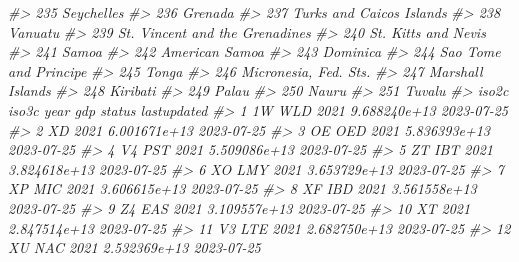 \documentclass[
  xelatex, ja=standard]{bxjsbook}
\newenvironment{Shaded}{\begin{snugshade}}{\end{snugshade}}
\newcommand{\CommentTok}[1]{\textcolor[rgb]{0.56,0.35,0.01}{\textit{#1}}}
\theoremstyle{definition}
\theoremstyle{definition}
\theoremstyle{definition}
\theoremstyle{definition}
\theoremstyle{remark}
\begin{document}
\begin{Shaded}
\begin{Highlighting}[]
\CommentTok{\#\textgreater{} 235                                           Seychelles}
\CommentTok{\#\textgreater{} 236                                              Grenada}
\CommentTok{\#\textgreater{} 237                             Turks and Caicos Islands}
\CommentTok{\#\textgreater{} 238                                              Vanuatu}
\CommentTok{\#\textgreater{} 239                       St. Vincent and the Grenadines}
\CommentTok{\#\textgreater{} 240                                  St. Kitts and Nevis}
\CommentTok{\#\textgreater{} 241                                                Samoa}
\CommentTok{\#\textgreater{} 242                                       American Samoa}
\CommentTok{\#\textgreater{} 243                                             Dominica}
\CommentTok{\#\textgreater{} 244                                Sao Tome and Principe}
\CommentTok{\#\textgreater{} 245                                                Tonga}
\CommentTok{\#\textgreater{} 246                                Micronesia, Fed. Sts.}
\CommentTok{\#\textgreater{} 247                                     Marshall Islands}
\CommentTok{\#\textgreater{} 248                                             Kiribati}
\CommentTok{\#\textgreater{} 249                                                Palau}
\CommentTok{\#\textgreater{} 250                                                Nauru}
\CommentTok{\#\textgreater{} 251                                               Tuvalu}
\CommentTok{\#\textgreater{}     iso2c iso3c year          gdp status lastupdated}
\CommentTok{\#\textgreater{} 1      1W   WLD 2021 9.688240e+13         2023{-}07{-}25}
\CommentTok{\#\textgreater{} 2      XD       2021 6.001671e+13         2023{-}07{-}25}
\CommentTok{\#\textgreater{} 3      OE   OED 2021 5.836393e+13         2023{-}07{-}25}
\CommentTok{\#\textgreater{} 4      V4   PST 2021 5.509086e+13         2023{-}07{-}25}
\CommentTok{\#\textgreater{} 5      ZT   IBT 2021 3.824618e+13         2023{-}07{-}25}
\CommentTok{\#\textgreater{} 6      XO   LMY 2021 3.653729e+13         2023{-}07{-}25}
\CommentTok{\#\textgreater{} 7      XP   MIC 2021 3.606615e+13         2023{-}07{-}25}
\CommentTok{\#\textgreater{} 8      XF   IBD 2021 3.561558e+13         2023{-}07{-}25}
\CommentTok{\#\textgreater{} 9      Z4   EAS 2021 3.109557e+13         2023{-}07{-}25}
\CommentTok{\#\textgreater{} 10     XT       2021 2.847514e+13         2023{-}07{-}25}
\CommentTok{\#\textgreater{} 11     V3   LTE 2021 2.682750e+13         2023{-}07{-}25}
\CommentTok{\#\textgreater{} 12     XU   NAC 2021 2.532369e+13         2023{-}07{-}25}

\end{Highlighting}
\end{Shaded}
\end{document}
